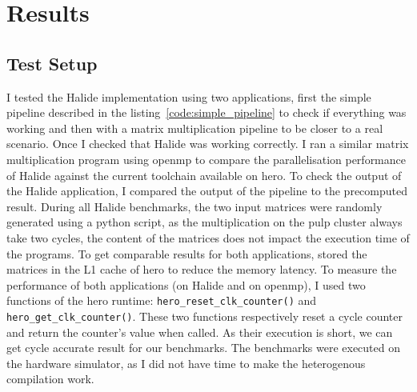 
\chapter{Results}
\section{Test Setup}
	I tested the Halide implementation using two applications, first the simple pipeline described in the listing~\ref{code:simple_pipeline} to check if everything was working and then with a matrix multiplication pipeline to be closer to a real scenario. Once I checked that Halide was working correctly.
	I ran a similar matrix multiplication program using \gls{openmp} to compare the parallelisation performance of Halide against the current toolchain available on \gls{hero}.
	To check the output of the Halide application, I compared the output of the pipeline to the precomputed result.
	During  all Halide benchmarks, the two input matrices were randomly generated using a python script, as the multiplication on the \gls{pulp} cluster always take two cycles, the content of the matrices does not impact the execution time of the programs.
	To get comparable results for both applications, stored the matrices in the L1 cache of \gls{hero} to reduce the memory latency.
	To measure the performance of both applications (on Halide and on \gls{openmp}), I used two functions of the \gls{hero} runtime: \texttt{hero\_reset\_clk\_counter()} and \texttt{hero\_get\_clk\_counter()}.
	These two functions respectively reset a cycle counter and return the counter's value when called. As their execution is short, we can get cycle accurate result for our benchmarks.
	The benchmarks were executed on the hardware simulator, as I did not have time to make the heterogenous compilation work.

